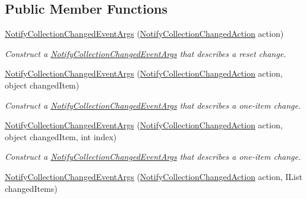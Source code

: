 \subsection*{Public Member Functions}
\begin{DoxyCompactItemize}
\item 
\hyperlink{class_system_1_1_collections_1_1_specialized_1_1_notify_collection_changed_event_args_a55e91ab8b8545057ce857e986f5e173a}{Notify\+Collection\+Changed\+Event\+Args} (\hyperlink{namespace_system_1_1_collections_1_1_specialized_a7e21ea761562ed22011c3120bbb31123}{Notify\+Collection\+Changed\+Action} action)
\begin{DoxyCompactList}\small\item\em Construct a \hyperlink{class_system_1_1_collections_1_1_specialized_1_1_notify_collection_changed_event_args}{Notify\+Collection\+Changed\+Event\+Args} that describes a reset change. \end{DoxyCompactList}\item 
\hyperlink{class_system_1_1_collections_1_1_specialized_1_1_notify_collection_changed_event_args_a86b4fa9f38021e9e0d1018fbc5b11713}{Notify\+Collection\+Changed\+Event\+Args} (\hyperlink{namespace_system_1_1_collections_1_1_specialized_a7e21ea761562ed22011c3120bbb31123}{Notify\+Collection\+Changed\+Action} action, object changed\+Item)
\begin{DoxyCompactList}\small\item\em Construct a \hyperlink{class_system_1_1_collections_1_1_specialized_1_1_notify_collection_changed_event_args}{Notify\+Collection\+Changed\+Event\+Args} that describes a one-\/item change. \end{DoxyCompactList}\item 
\hyperlink{class_system_1_1_collections_1_1_specialized_1_1_notify_collection_changed_event_args_adc1dee1f065384489aa2b47b03251763}{Notify\+Collection\+Changed\+Event\+Args} (\hyperlink{namespace_system_1_1_collections_1_1_specialized_a7e21ea761562ed22011c3120bbb31123}{Notify\+Collection\+Changed\+Action} action, object changed\+Item, int index)
\begin{DoxyCompactList}\small\item\em Construct a \hyperlink{class_system_1_1_collections_1_1_specialized_1_1_notify_collection_changed_event_args}{Notify\+Collection\+Changed\+Event\+Args} that describes a one-\/item change. \end{DoxyCompactList}\item 
\hyperlink{class_system_1_1_collections_1_1_specialized_1_1_notify_collection_changed_event_args_a2a0ad37e0e2d5005660ee97751ed0190}{Notify\+Collection\+Changed\+Event\+Args} (\hyperlink{namespace_system_1_1_collections_1_1_specialized_a7e21ea761562ed22011c3120bbb31123}{Notify\+Collection\+Changed\+Action} action, I\+List changed\+Items)

\end{DoxyCompactItemize}
